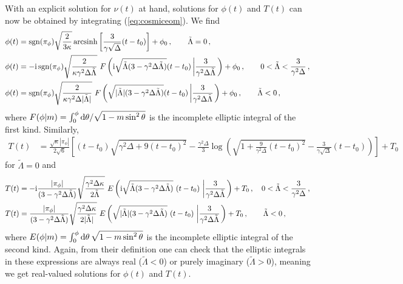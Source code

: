 \documentclass[aps,prd,11pt,showkeys,nofootinbib]{revtex4-2}
\def\im{{\rm i}}
\begin{document}
With an explicit solution for $\nu(t)$ at hand, solutions for $\phi(t)$ and $T(t)$ can now be obtained by integrating (\ref{eq:cosmiceom}). We find
\begin{align}
\phi(t)&={\rm sgn}(\pi_\phi)\sqrt{\frac{2}{3\kappa}}\,\textrm{arcsinh}\left[\frac{3}{\gamma\sqrt{\Delta}}(t-t_0)\right]+\phi_0\,,\qquad \tilde\Lambda=0\,,\label{eq:phiteff L0}\\
    \phi(t)&=-\im\,{\rm sgn}(\pi_\phi)\sqrt{\frac{2}{\kappa\gamma^2\Delta\tilde{\Lambda}}}\ F\left(\im\sqrt{\tilde\Lambda(3-\gamma^2\Delta\tilde\Lambda)}(t-t_0) \left \vert \frac{3}{\gamma^2\Delta\tilde{\Lambda}} \right. \right)+\phi_0\,,\qquad 0<\tilde{\Lambda}<\frac{3}{\gamma^2\Delta}\,,\label{eq:phiteff Lpos}\\
    \phi(t)&={\rm sgn}(\pi_\phi)\sqrt{\frac{2}{\kappa\gamma^2\Delta|\tilde{\Lambda}|}}\  F\left(\sqrt{|\tilde\Lambda|(3-\gamma^2\Delta\tilde\Lambda)}(t-t_0) \left \vert \frac{3}{\gamma^2\Delta\tilde{\Lambda}} \right. \right)+\phi_0\,,\qquad \tilde{\Lambda}<0\,,\label{eq:phiteff Lneg}
\end{align}
where $F(\phi\vert m)=\int_0^\phi {\rm d}\theta/\sqrt{1-m\sin^2\theta}$ is the incomplete elliptic integral of the first kind. Similarly,
\begin{align}
    T(t) &= \frac{\sqrt{\kappa}|\pi_\phi|}{2\sqrt{6}}
    \left[(t-t_0)\sqrt{\gamma^2\Delta+9(t-t_0)^2}-\frac{\gamma^2\Delta}{3}\log\left(\sqrt{1+\frac{9}{\gamma^2\Delta}(t-t_0)^2}-\frac{3}{\gamma\sqrt{\Delta}}(t-t_0)\right)\right]+T_0\label{eq:Tteff L0}
    \end{align}
    for $\tilde\Lambda=0$ and
    \begin{align}
    T(t) &= -\im\frac{|\pi_\phi|}{(3-\gamma^2\Delta\tilde\Lambda)}\sqrt{\frac{\gamma^2\Delta\kappa}{2\tilde{\Lambda}}}\ E\left(\im\sqrt{\tilde\Lambda(3-\gamma^2\Delta\tilde\Lambda)}\ (t-t_0)\, \left \vert \frac{3}{\gamma^2 \Delta\tilde{\Lambda}}\right. \right)+T_0\,,\quad 0<\tilde{\Lambda}<\frac{3}{\gamma^2\Delta}\,,\label{eq:Tteff Lpos}\\
    T(t) &= \frac{|\pi_\phi|}{(3-\gamma^2\Delta\tilde\Lambda)}\sqrt{\frac{\gamma^2\Delta\kappa}{2|\tilde{\Lambda}|}}\ E\left(\sqrt{|\tilde\Lambda|(3-\gamma^2\Delta\tilde\Lambda)}\ (t-t_0)\, \left \vert \frac{3}{\gamma^2 \Delta \tilde{\Lambda}}\right. \right)+T_0\,,\qquad\tilde\Lambda<0\,,\label{eq:Tteff Lneg}
\end{align}
where $E(\phi\vert m)=\int_0^\phi{\rm d}\theta\,\sqrt{1-m\sin^2\theta}$ is the incomplete elliptic integral of the second kind.  Again, from their definition one can check that the elliptic integrals in these expressions are always real ($\tilde\Lambda<0$) or purely imaginary ($\tilde\Lambda>0$), meaning we get real-valued solutions for $\phi(t)$ and $T(t)$.
\end{document}
